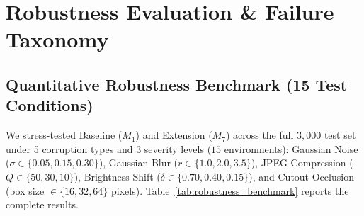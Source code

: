 \documentclass[conference]{IEEEtran}
\begin{document}
\section{Robustness Evaluation \& Failure Taxonomy}
\label{sec:robustness}

\subsection{Quantitative Robustness Benchmark (15 Test Conditions)}
We stress-tested Baseline ($M_1$) and Extension ($M_7$) across the full $3,000$ test set under 5 corruption types and 3 severity levels ($15$ environments): Gaussian Noise ($\sigma \in \{0.05, 0.15, 0.30\}$), Gaussian Blur ($r \in \{1.0, 2.0, 3.5\}$), JPEG Compression ($Q \in \{50, 30, 10\}$), Brightness Shift ($\delta \in \{0.70, 0.40, 0.15\}$), and Cutout Occlusion (box size $\in \{16, 32, 64\}$ pixels). Table~\ref{tab:robustness_benchmark} reports the complete results.
\end{document}
